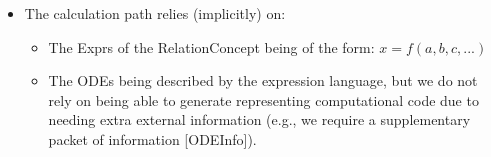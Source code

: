 \begin{itemize}
      \item The calculation path relies (implicitly) on:
            \begin{itemize}

                  \item The Exprs of the RelationConcept being of the form: $x =
                              f(a,b,c,...)$

                  \item The ODEs being described by the expression language, but we
                        do not rely on being able to generate representing
                        computational code due to needing extra external information
                        (e.g., we require a supplementary packet of information
                              [ODEInfo]).

            \end{itemize}

\end{itemize}



